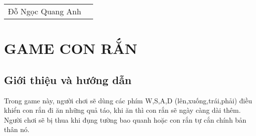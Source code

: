 \documentclass[a4paper,14pt]{extreport}
\begin{document}
\begin{tabular}{p{10cm} p{4cm}}
Đỗ Ngọc Quang Anh
\end{tabular}
\newpage 

\chapter{GAME CON RẮN} %


\section{Giới thiệu và hướng dẫn}
 \item Trong game này, người chơi sẽ dùng các phím W,S,A,D (lên,xuống,trái,phải) điều khiển con rắn đi ăn những quả táo, khi ăn thì con rắn sẽ ngày càng dài thêm. Người chơi sẽ bị thua khi đụng tường bao quanh hoặc con rắn tự cắn chính bản thân nó.
\end{document}
